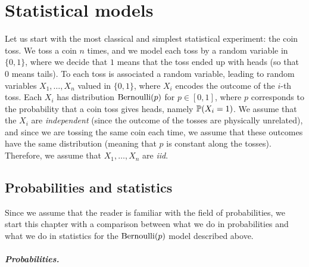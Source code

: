 \setchapterpreamble[u]{\margintoc}
\chapter{Statistical models}
\label{chap:statistical_models}

Let us start with the most classical and simplest statistical experiment: the coin toss.
We toss a coin $n$ times, and we model each toss by a random variable in $\{ 0, 1 \}$, where we decide that $1$ means that the toss ended up with heads (so that $0$ means tails).
To each toss is associated a random variable, leading to random variables $X_1, \ldots, X_n$  valued in $\{ 0, 1 \}$, where $X_i$ encodes the outcome of the $i$-th toss.
Each $X_i$ has distribution $\ber(p)$ for $p \in [0, 1]$, where $p$ corresponds to the probability that a coin toss gives heads, namely $\P(X_i = 1)$.%
We assume that the $X_i$ are \emph{independent} (since the outcome of the tosses are physically unrelated), and since we are tossing the same coin each time, we assume that these outcomes have the same distribution (meaning that $p$ is constant along the tosses).
Therefore, we assume that $X_1, \ldots, X_n$ are \emph{iid}.%

\section{Probabilities and statistics} %
\label{sec:probability_versus_statistics}

Since we assume that the reader is familiar with the field of probabilities, we start this chapter with a comparison between what we do in probabilities and what we do in statistics for the $\ber(p)$ model described above.


\paragraph{Probabilities.} %

